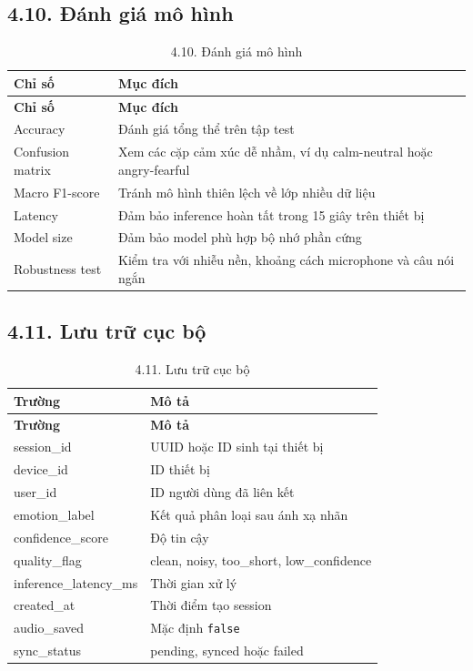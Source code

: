 \documentclass[12pt,a4paper]{article}
\begin{document}
\subsection*{4.10. Đánh giá mô hình}

\begin{center}
\begin{longtable}{|P{0.30\textwidth}|P{0.62\textwidth}|}
\caption{4.10. Đánh giá mô hình}\\
\hline
\textbf{Chỉ số} & \textbf{Mục đích} \\
\hline
\endfirsthead
\hline
\textbf{Chỉ số} & \textbf{Mục đích} \\
\hline
\endhead
Accuracy & Đánh giá tổng thể trên tập test \\
\hline
Confusion matrix & Xem các cặp cảm xúc dễ nhầm, ví dụ calm-neutral hoặc angry-fearful \\
\hline
Macro F1-score & Tránh mô hình thiên lệch về lớp nhiều dữ liệu \\
\hline
Latency & Đảm bảo inference hoàn tất trong 15 giây trên thiết bị \\
\hline
Model size & Đảm bảo model phù hợp bộ nhớ phần cứng \\
\hline
Robustness test & Kiểm tra với nhiễu nền, khoảng cách microphone và câu nói ngắn \\
\hline
\end{longtable}
\end{center}

\subsection*{4.11. Lưu trữ cục bộ}

\begin{center}
\begin{longtable}{|P{0.30\textwidth}|P{0.62\textwidth}|}
\caption{4.11. Lưu trữ cục bộ}\\
\hline
\textbf{Trường} & \textbf{Mô tả} \\
\hline
\endfirsthead
\hline
\textbf{Trường} & \textbf{Mô tả} \\
\hline
\endhead
session\_id & UUID hoặc ID sinh tại thiết bị \\
\hline
device\_id & ID thiết bị \\
\hline
user\_id & ID người dùng đã liên kết \\
\hline
emotion\_label & Kết quả phân loại sau ánh xạ nhãn \\
\hline
confidence\_score & Độ tin cậy \\
\hline
quality\_flag & clean, noisy, too\_short, low\_confidence \\
\hline
inference\_latency\_ms & Thời gian xử lý \\
\hline
created\_at & Thời điểm tạo session \\
\hline
audio\_saved & Mặc định \texttt{false} \\
\hline
sync\_status & pending, synced hoặc failed \\
\hline
\end{longtable}
\end{center}
\end{document}
